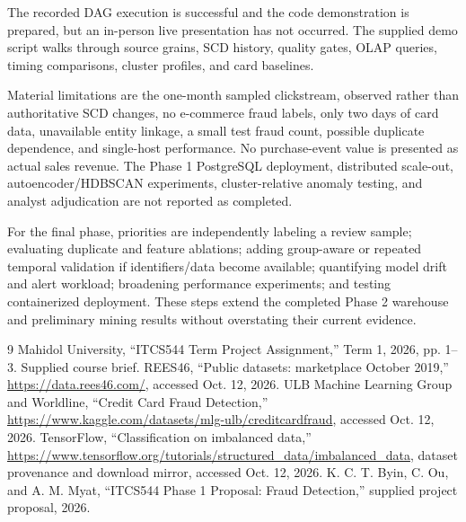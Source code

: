 \documentclass[conference]{IEEEtran}
\begin{document}
The recorded DAG execution is successful and the code demonstration is prepared, but an in-person live presentation has not occurred. The supplied demo script walks through source grains, SCD history, quality gates, OLAP queries, timing comparisons, cluster profiles, and card baselines. 

Material limitations are the one-month sampled clickstream, observed rather than authoritative SCD changes, no e-commerce fraud labels, only two days of card data, unavailable entity linkage, a small test fraud count, possible duplicate dependence, and single-host performance. No purchase-event value is presented as actual sales revenue. The Phase 1 PostgreSQL deployment, distributed scale-out, autoencoder/HDBSCAN experiments, cluster-relative anomaly testing, and analyst adjudication are not reported as completed.

For the final phase, priorities are independently labeling a review sample; evaluating duplicate and feature ablations; adding group-aware or repeated temporal validation if identifiers/data become available; quantifying model drift and alert workload; broadening performance experiments; and testing containerized deployment. These steps extend the completed Phase 2 warehouse and preliminary mining results without overstating their current evidence.

\begin{thebibliography}{9}
 Mahidol University, ``ITCS544 Term Project Assignment,'' Term 1, 2026, pp. 1--3. Supplied course brief.
 REES46, ``Public datasets: marketplace October 2019,'' \url{https://data.rees46.com/}, accessed Oct. 12, 2026.
 ULB Machine Learning Group and Worldline, ``Credit Card Fraud Detection,'' \url{https://www.kaggle.com/datasets/mlg-ulb/creditcardfraud}, accessed Oct. 12, 2026.
 TensorFlow, ``Classification on imbalanced data,'' \url{https://www.tensorflow.org/tutorials/structured_data/imbalanced_data}, dataset provenance and download mirror, accessed Oct. 12, 2026.
 K. C. T. Byin, C. Ou, and A. M. Myat, ``ITCS544 Phase 1 Proposal: Fraud Detection,'' supplied project proposal, 2026.
\end{thebibliography}
\end{document}
